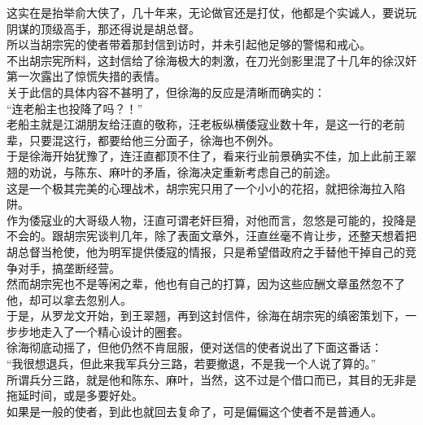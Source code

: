 \begin{multicols}{\theparacolNo}
这实在是抬举俞大侠了，几十年来，无论做官还是打仗，他都是个实诚人，要说玩阴谋的顶级高手，那还得说是胡总督。\\

所以当胡宗宪的使者带着那封信到访时，并未引起他足够的警惕和戒心。\\

不出胡宗宪所料，这封信给了徐海极大的刺激，在刀光剑影里混了十几年的徐汉奸第一次露出了惊慌失措的表情。\\

关于此信的具体内容不甚明了，但徐海的反应是清晰而确实的：\\

“连老船主也投降了吗？！”\\

老船主就是江湖朋友给汪直的敬称，汪老板纵横倭寇业数十年，是这一行的老前辈，只要混这行，都要给他三分面子，徐海也不例外。\\

于是徐海开始犹豫了，连汪直都顶不住了，看来行业前景确实不佳，加上此前王翠翘的劝说，与陈东、麻叶的矛盾，徐海决定重新考虑自己的前途。\\

这是一个极其完美的心理战术，胡宗宪只用了一个小小的花招，就把徐海拉入陷阱。\\

作为倭寇业的大哥级人物，汪直可谓老奸巨猾，对他而言，忽悠是可能的，投降是不会的。跟胡宗宪谈判几年，除了表面文章外，汪直丝毫不肯让步，还整天想着把胡总督当枪使，他为明军提供倭寇的情报，只是希望借政府之手替他干掉自己的竞争对手，搞垄断经营。\\

然而胡宗宪也不是等闲之辈，他也有自己的打算，因为这些应酬文章虽然忽不了他，却可以拿去忽别人。\\

于是，从罗龙文开始，到王翠翘，再到这封信件，徐海在胡宗宪的缜密策划下，一步步地走入了一个精心设计的圈套。\\

徐海彻底动摇了，但他仍然不肯屈服，便对送信的使者说出了下面这番话：\\

“我很想退兵，但此来我军兵分三路，若要撤退，不是我一个人说了算的。”\\

所谓兵分三路，就是他和陈东、麻叶，当然，这不过是个借口而已，其目的无非是拖延时间，或是多要好处。\\

如果是一般的使者，到此也就回去复命了，可是偏偏这个使者不是普通人。\\


\end{multicols}
